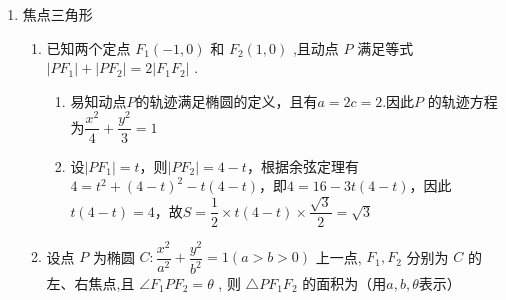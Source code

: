 \begin{enumerate}
\begin{enumerate}
\begin{jieda}
        \end{jieda}
        \item 设 ${F}_{1},{F}_{2}$ 是椭圆 $E : \dfrac{{x}^{2}}{{a}^{2}} + \dfrac{{y}^{2}}{{b}^{2}} = 1\left( {a > b > 0}\right)$ 的左、右焦点,过点 ${F}_{1}$ 且斜率为 $\dfrac{\sqrt{3}}{3}$ 的直线交椭圆于点 $P$ ,若 $2\angle P{F}_{1}{F}_{2} = \angle P{F}_{2}{F}_{1}$ ,则椭圆 $E$ 的离心率为
        \begin{jieda}
            由题干可知$\angle PF_1F_2 = \ang{30}, \angle PF_2F_1 = \ang{60}$，因此$PF_1 \perp PF_2$，所以根据几何关系有$F_1F_2 = 2c, PF_2 = c, PF_1 = \sqrt{3}c$，故$2a = (\sqrt{3}+1)c$，故$e = \dfrac{c}{a} = \dfrac{2}{\sqrt{3}+1} = \sqrt{3}-1$
        \end{jieda}
        
    \end{enumerate}
    \item 焦点三角形
    \begin{enumerate}
        \item 已知两个定点 ${F}_{1}\left( {-1,0}\right)$ 和 ${F}_{2}\left( {1,0}\right)$ ,且动点 $P$ 满足等式 $\left| {P{F}_{1}}\right|  + \left| {P{F}_{2}}\right|  = 2\left| {{F}_{1}{F}_{2}}\right|$ .
        \begin{jieda}
            \begin{enumerate}
                \item 易知动点$P$的轨迹满足椭圆的定义，且有$a = 2c = 2$.因此$P$ 的轨迹方程为$\dfrac{x^2}{4} + \dfrac{y^2}{3} = 1$
                \item 设$|PF_1| = t$，则$|PF_2| = 4-t$，根据余弦定理有$4 = t^2 + (4-t)^2 - t(4-t)$，即$4 = 16 - 3t(4-t)$，因此$t(4-t) = 4$，故$S = \dfrac{1}{2} \times t(4-t) \times \dfrac{\sqrt{3}}{2} = \sqrt{3}$
            \end{enumerate}
        \end{jieda}
        \item 设点 $P$ 为椭圆 $C : \dfrac{{x}^{2}}{{a}^{2}} + \dfrac{{y}^{2}}{b^2} = 1\left( {a > b > 0}\right)$ 上一点, ${F}_{1},{F}_{2}$ 分别为 $C$ 的左、右焦点,且 $\angle {F}_{1}P{F}_{2} = \theta$ , 则 $\bigtriangleup  P{F}_{1}{F}_{2}$ 的面积为（用$a, b, \theta$表示）

\end{enumerate}
\end{enumerate}

